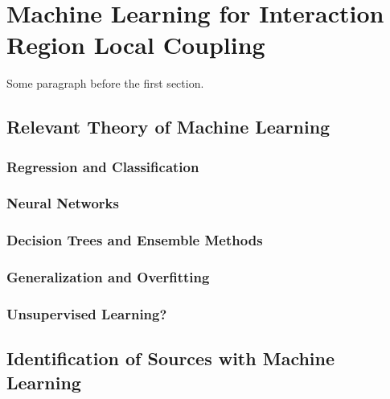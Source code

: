 \chapter{Machine Learning for Interaction Region Local Coupling} %

\label{Chapter:ML_Local_Coupling} %


Some paragraph before the first section.


\section{Relevant Theory of Machine Learning}

\subsection{Regression and Classification}

\subsection{Neural Networks}

\subsection{Decision Trees and Ensemble Methods}

\subsection{Generalization and Overfitting}

\subsection{Unsupervised Learning?}


\section{Identification of Sources with Machine Learning}

